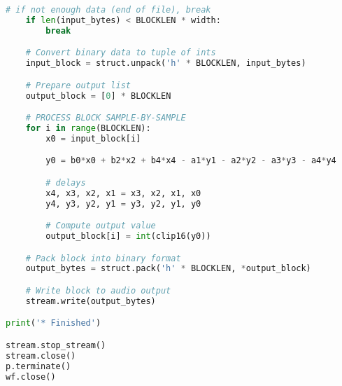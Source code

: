 \documentclass[11pt]{article}
\begin{document}
\begin{lstlisting}[language=python, label={lst:code}, breaklines=true, ]
    # if not enough data (end of file), break
    if len(input_bytes) < BLOCKLEN * width:
        break

    # Convert binary data to tuple of ints
    input_block = struct.unpack('h' * BLOCKLEN, input_bytes)

    # Prepare output list
    output_block = [0] * BLOCKLEN

    # PROCESS BLOCK SAMPLE-BY-SAMPLE 
    for i in range(BLOCKLEN):
        x0 = input_block[i]

        y0 = b0*x0 + b2*x2 + b4*x4 - a1*y1 - a2*y2 - a3*y3 - a4*y4

        # delays
        x4, x3, x2, x1 = x3, x2, x1, x0
        y4, y3, y2, y1 = y3, y2, y1, y0

        # Compute output value
        output_block[i] = int(clip16(y0))

    # Pack block into binary format
    output_bytes = struct.pack('h' * BLOCKLEN, *output_block)

    # Write block to audio output
    stream.write(output_bytes)

print('* Finished')

stream.stop_stream()
stream.close()
p.terminate()
wf.close()
\end{lstlisting}    
    
\end{document}
